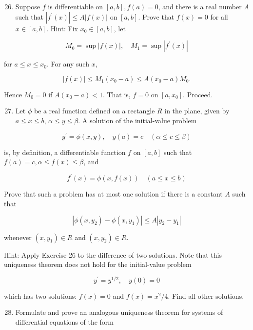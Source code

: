 \documentclass[10pt]{article}
\begin{document}
\begin{enumerate}
  \setcounter{enumi}{25}
  \item Suppose $f$ is differentiable on $[a, b], f(a)=0$, and there is a real number $A$ such that $\left|f^{\prime}(x)\right| \leq A|f(x)|$ on $[a, b]$. Prove that $f(x)=0$ for all $x \in[a, b]$. Hint: Fix $x_{0} \in[a, b]$, let
\end{enumerate}

$$
M_{0}=\sup |f(x)|, \quad M_{1}=\sup \left|f^{\prime}(x)\right|
$$

for $a \leq x \leq x_{0}$. For any such $x$,

$$
|f(x)| \leq M_{1}\left(x_{0}-a\right) \leq A\left(x_{0}-a\right) M_{0} .
$$

Hence $M_{0}=0$ if $A\left(x_{0}-a\right)<1$. That is, $f=0$ on $\left[a, x_{0}\right]$. Proceed.

\begin{enumerate}
  \setcounter{enumi}{26}
  \item Let $\phi$ be a real function defined on a rectangle $R$ in the plane, given by $a \leq x \leq b$, $\alpha \leq y \leq \beta$. A solution of the initial-value problem
\end{enumerate}

$$
y^{\prime}=\phi(x, y), \quad y(a)=c \quad(\alpha \leq c \leq \beta)
$$

is, by definition, a differentiable function $f$ on $[a, b]$ such that $f(a)=c, \alpha \leq f(x) \leq \beta$, and

$$
f^{\prime}(x)=\phi(x, f(x)) \quad(a \leq x \leq b)
$$

Prove that such a problem has at most one solution if there is a constant $A$ such that

$$
\left|\phi\left(x, y_{2}\right)-\phi\left(x, y_{1}\right)\right| \leq A\left|y_{2}-y_{1}\right|
$$

whenever $\left(x, y_{1}\right) \in R$ and $\left(x, y_{2}\right) \in R$.

Hint: Apply Exercise 26 to the difference of two solutions. Note that this uniqueness theorem does not hold for the initial-value problem

$$
y^{\prime}=y^{1 / 2}, \quad y(0)=0
$$

which has two solutions: $f(x)=0$ and $f(x)=x^{2} / 4$. Find all other solutions.

\begin{enumerate}
  \setcounter{enumi}{27}
  \item Formulate and prove an analogous uniqueness theorem for systems of differential equations of the form
\end{enumerate}
\end{document}
